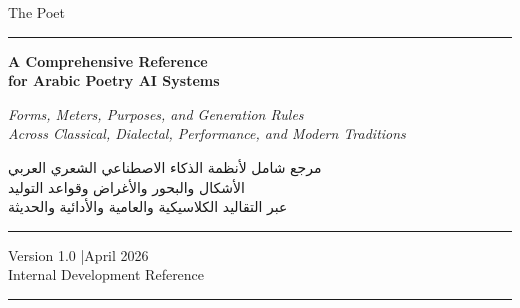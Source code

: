 \documentclass[12pt,a4paper,twoside]{report}
\def\foreignlanguage#1#2{}%
\begin{document}
\begin{titlepage}
  \pagecolor{PoetDark}
  \color{white}
  \centering
  \vspace*{2cm}

  {\fontsize{72}{80}\selectfont\color{PoetGold}%
    \foreignlanguage{arabic}{الشاعر}}

  \vspace{0.4cm}

  {\LARGE\color{PoetSand} The Poet}

  \vspace{1.5cm}

  \color{PoetGold}\rule{0.6\textwidth}{0.8pt}

  \vspace{1cm}

  {\Large\bfseries\color{white}
    A Comprehensive Reference\\[0.4em]
    for Arabic Poetry AI Systems}

  \vspace{0.5cm}

  {\large\color{PoetSand}\itshape
    Forms, Meters, Purposes, and Generation Rules\\[0.2em]
    Across Classical, Dialectal, Performance, and Modern Traditions}

  \vspace{2cm}

  {\normalsize\color{PoetGold}
    \begin{otherlanguage}{arabic}
      مرجع شامل لأنظمة الذكاء الاصطناعي الشعري العربي\\[0.3em]
      الأشكال والبحور والأغراض وقواعد التوليد\\[0.2em]
      عبر التقاليد الكلاسيكية والعامية والأدائية والحديثة
    \end{otherlanguage}
  }

  \vspace{2.5cm}

  \color{PoetGold}\rule{0.6\textwidth}{0.4pt}

  \vspace{1cm}

  {\small\color{PoetSand}
    Version 1.0 \quad|\quad April 2026\\[0.4em]
    Internal Development Reference
  }

  \vfill

  \color{PoetGold}\rule{0.8\textwidth}{0.2pt}

  \nopagecolor
\end{titlepage}


\tableofcontents
\newpage
\listoftables
\newpage








\printbibliography[heading=bibintoc,title={References / المراجع}]

\appendix


\end{document}

